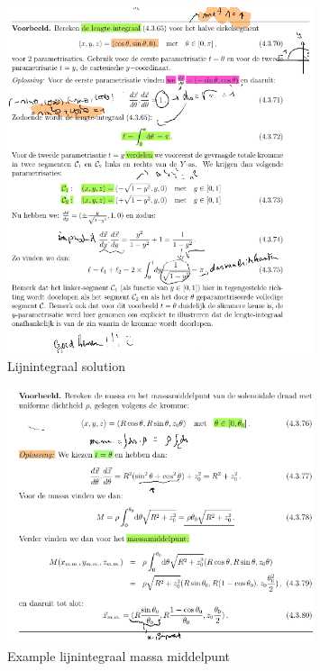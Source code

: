 \documentclass[a4paper]{report}
\begin{document}
\begin{figure}[H]
	\centering
	\includegraphics[width=0.8\textwidth]{assets/lijnintegraal_solution.png}
	\caption{Lijnintegraal solution}
	\label{fig:lijnintegraal_solution}
\end{figure}


\begin{figure}[H]
	\centering
	\includegraphics[width=0.8\textwidth]{assets/example_lijnintegraal_massa_middelpunt.png}
	\caption{Example lijnintegraal massa middelpunt}
	\label{fig:example_lijnintegraal_massa_middelpunt}
\end{figure}
\end{document}
